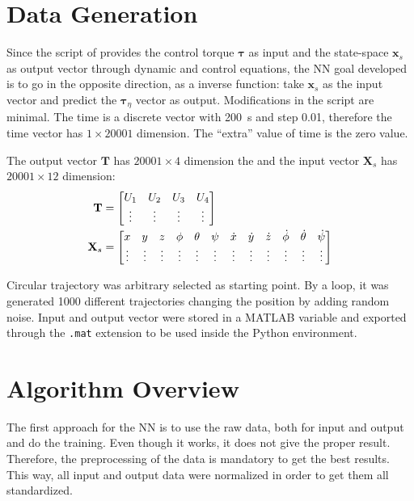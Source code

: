 \section{Data Generation}

Since the script of \textcite{geronel2023} provides the control torque \(\mathbf{\tau}\) as input and the state-space \(\mathbf{x}_s\) as output vector through dynamic and control equations, the NN goal developed is to go in the opposite direction, as a inverse function: take \(\mathbf{x}_s\) as the input vector and predict the \(\mathbf{\tau}_{\eta}\) vector as output.
Modifications in the script are minimal.
The time is a discrete vector with \SI{200}{s} and step 0.01, therefore the time vector has \(1\times 20001\) dimension.
The ``extra'' value of time is the zero value.

The output vector \(\mathbf{T}\) has \(20001\times 4\) dimension the and the input vector \(\mathbf{X}_s\) has  \(20001\times 12\) dimension:
%
\begin{align}
    \mathbf{T} &= \begin{bmatrix}
        U_1 & U_2 & U_3 & U_4 \\
        \vdots       & \vdots       & \vdots       & \vdots  \\
    \end{bmatrix} 
    \label{eq:tau_input} \\
    \setcounter{MaxMatrixCols}{13}
    \mathbf{X}_s &=
    \begin{bmatrix}
        x&y&z&\phi&\theta&\psi&\dot{x}&\dot{y}&\dot{z}&\dot{\phi}&\dot{\theta}&\dot{\psi} \\
        \vdots & \vdots & \vdots & \vdots & \vdots & \vdots & \vdots & \vdots & \vdots & \vdots & \vdots & \vdots 
    \end{bmatrix}
    \label{eq:xs_output}
\end{align}

Circular trajectory was arbitrary selected as starting point.
By a loop, it was generated 1000 different trajectories changing the position  by adding random noise.
Input and output vector were stored in a MATLAB variable and exported through the \texttt{.mat} extension to be used inside the Python environment.

\section{Algorithm Overview}

The first approach for the NN is to use the raw data, both for input and output and do the training.
Even though it works, it does not give the proper result.
Therefore, the preprocessing of the data is mandatory to get the best results.
This way, all input and output data were normalized in order to get them all standardized.


